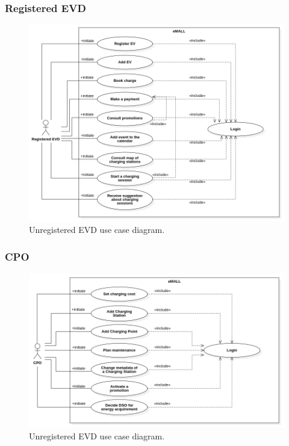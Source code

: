 \subsubsection*{Registered EVD}
\begin{figure} [H]
    \begin{center}
        \includegraphics[width=0.9\linewidth]{Images/UseCaseDiagrams/registered_EVD_use_case_diagram}
        \caption{Unregistered EVD use case diagram.}
        \label{fig: reg_EVD_diag}
    \end{center}
\end{figure}

\subsubsection*{CPO}
\begin{figure} [H]
    \begin{center}
        \includegraphics[width=0.9\linewidth]{Images/UseCaseDiagrams/CPO_use_case_diagram}
        \caption{Unregistered EVD use case diagram.}
        \label{fig: cpo_diag}
    \end{center}
\end{figure}

